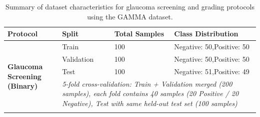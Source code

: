 \documentclass[preprint,12pt]{elsarticle}
\begin{document}
\begin{table}[!t]
    \centering
    \caption{Summary of dataset characteristics for glaucoma screening and grading protocols using the GAMMA dataset.}
    \label{tab:dataset_summary}
    \scriptsize
    \setlength{\tabcolsep}{5pt}
    \begin{tabular}{|p{}|p{}|p{}|p{}|}
        \hline
        \centering \textbf{Protocol} & \textbf{Split}                                                                                                                                                                                                                                  & \textbf{Total Samples} & \textbf{Class Distribution}                       \\
        \hline
        \multirow{5}{*}{\parbox{0.16\textwidth}{\centering \textbf{Glaucoma Screening (Binary)}}}
                                     & Train                                                                                                                                                                                                                                           & 100                    & Negative: 50,\quad Positive: 50                   \\
                                     & Validation                                                                                                                                                                                                                                      & 100                    & Negative: 50,\quad Positive: 50                   \\
                                     & Test                                                                                                                                                                                                                                            & 100                    & Negative: 51,\quad Positive: 49                   \\
        \cline{2-4}
                                     & \multicolumn{3}{|p{0.73\textwidth}|}{\textit{5-fold cross-validation: Train + Validation merged (200 samples), each fold contains 40 samples (20 Positive / 20 Negative), Test with same held-out test set (100 samples)}}                                                                                                   \\
        \hline
        \multirow{5}{*}{\parbox{0.16\textwidth}{\centering \textbf{Glaucoma Grading (Multiclass)}}}

\end{tabular}
\end{table}
\end{document}
